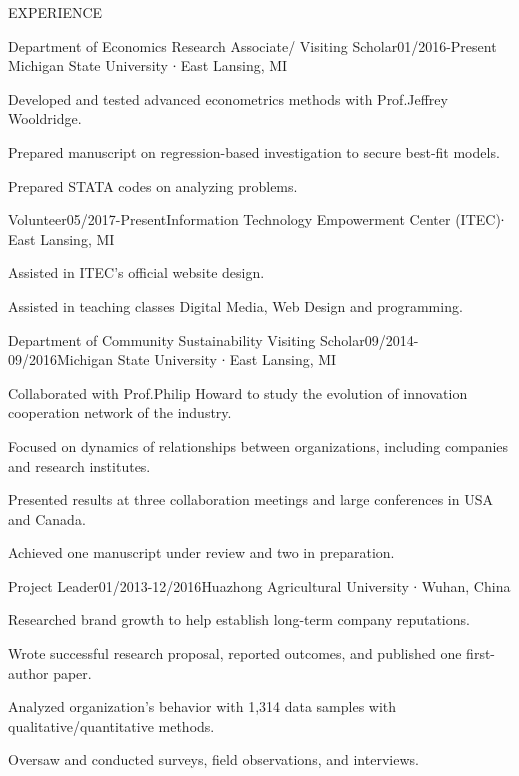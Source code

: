 \documentclass{resume} %
\begin{document}


\begin{rSection}{EXPERIENCE}

\begin{rSubsection}{Department of Economics Research Associate/ Visiting Scholar}{01/2016-Present} {Michigan State University ∙ East Lansing, MI} {} 
\item Developed and tested advanced econometrics methods with Prof.Jeffrey Wooldridge. 
\item Prepared manuscript on regression-based investigation to secure best-fit models.
\item Prepared STATA codes on analyzing problems.
\end{rSubsection}



\begin{rSubsection}{Volunteer}{05/2017-Present}{Information Technology Empowerment Center (ITEC)∙ East Lansing, MI} {}
 \item Assisted in ITEC’s official website design.
 \item Assisted in teaching classes Digital Media, Web Design and programming.
\end{rSubsection}



\begin{rSubsection}{Department of Community Sustainability Visiting Scholar}{09/2014-09/2016}{Michigan State University ∙ East Lansing, MI} {}
 \item Collaborated with Prof.Philip Howard to study the evolution of innovation cooperation network of the industry.
 \item Focused on dynamics of relationships between organizations, including companies and research institutes. 
 \item Presented results at three collaboration meetings and large conferences in USA and Canada. 
 \item Achieved one manuscript under review and two in preparation.
\end{rSubsection}


\begin{rSubsection}{Project Leader}{01/2013-12/2016}{Huazhong Agricultural University ∙ Wuhan, China} {}
 \item Researched brand growth to help establish long-term company reputations. 
 \item Wrote successful research proposal, reported outcomes, and published one first-author paper. 
 \item Analyzed organization’s behavior with 1,314 data samples with qualitative/quantitative methods.
 \item Oversaw and conducted surveys, field observations, and interviews.
\end{rSubsection}



\end{rSection}
\end{document}

